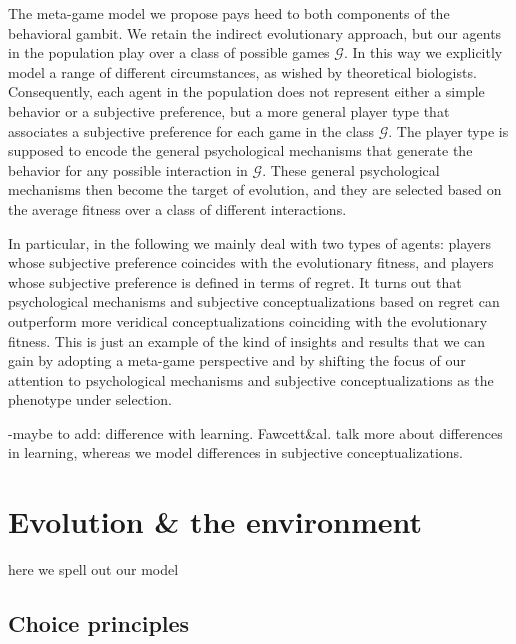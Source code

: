 \documentclass[fleqn,reqno,11pt]{article}
\begin{document}
The meta-game model we propose pays heed to both components of the behavioral gambit. We retain the indirect evolutionary approach, but our agents in the population play over a class of possible games $\mathcal{G}$. In this way we explicitly model a range of different circumstances, as wished by theoretical biologists.  Consequently, each agent in the population does not represent either a simple behavior or a subjective preference, but a more general player type that associates a subjective preference for each game in the class $\mathcal{G}$. The player type is supposed to encode the general psychological mechanisms that generate the behavior for any possible interaction in $\mathcal{G}$. These general psychological mechanisms then become the target of evolution, and they are selected based on the average fitness over a class of different interactions. 

In particular, in the following we mainly deal with two types of agents: players whose subjective preference coincides with the evolutionary fitness, and players whose subjective preference is defined in terms of regret. It turns out that psychological mechanisms and subjective conceptualizations based on regret can outperform more veridical conceptualizations coinciding with the evolutionary fitness.
This is just an example of the kind of insights and results that we can gain by adopting a meta-game perspective and by shifting the focus of our attention to psychological mechanisms and subjective conceptualizations as the phenotype under selection.


-maybe to add: difference with learning. Fawcett\&al. talk more about differences in learning, whereas we model differences in subjective conceptualizations.






\section{Evolution \& the environment}

here we spell out our model

\subsection{Choice principles}
\end{document}
